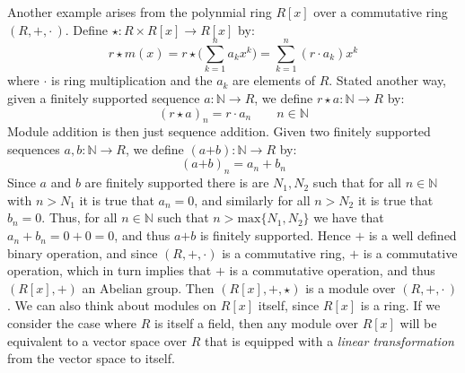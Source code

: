     \begin{example}
        Another example arises from the polynmial ring $R[x]$ over a commutative
        ring $(R,+,\cdot\,)$. Define $\star:R\times{R}[x]\rightarrow{R}[x]$ by:
        \begin{equation}
            r\star{m}(x)
            =r\star\Big(\sum_{k=1}^{n}a_{k}x^{k}\Big)
            =\sum_{k=1}^{n}(r\cdot{a}_{k})x^{k}
        \end{equation}
        where $\cdot$ is ring multiplication and the $a_{k}$ are elements of
        $R$. Stated another way, given a finitely supported sequence
        $a:\mathbb{N}\rightarrow{R}$, we define
        $r\star{a}:\mathbb{N}\rightarrow{R}$ by:
        \begin{equation}
            (r\star{a})_{n}=r\cdot{a}_{n}
            \quad\quad
            n\in\mathbb{N}
        \end{equation}
        Module addition is then just sequence addition. Given two finitely
        supported sequences $a,b:\mathbb{N}\rightarrow{R}$, we define
        $(a\boldsymbol{+}b):\mathbb{N}\rightarrow{R}$ by:
        \begin{equation}
            (a\boldsymbol{+}b)_{n}=a_{n}+b_{n}
        \end{equation}
        Since $a$ and $b$ are finitely supported there is are $N_{1},N_{2}$
        such that for all $n\in\mathbb{N}$ with $n>N_{1}$ it is true that
        $a_{n}=0$, and similarly for all $n>N_{2}$ it is true that $b_{n}=0$.
        Thus, for all $n\in\mathbb{N}$ such that $n>\textrm{max}\{N_{1},N_{2}\}$
        we have that $a_{n}+b_{n}=0+0=0$, and thus $a\boldsymbol{+}b$ is
        finitely supported. Hence $\boldsymbol{+}$ is a well defined binary
        operation, and since $(R,+,\cdot)$ is a commutative ring, $+$ is a
        commutative operation, which in turn implies that $\boldsymbol{+}$ is a
        commutative operation, and thus $(R[x],\boldsymbol{+})$ an Abelian
        group. Then $(R[x],\boldsymbol{+},\star)$ is a module over
        $(R,+,\cdot\,)$. We can also think about modules on $R[x]$ itself, since
        $R[x]$ is a ring. If we consider the case where $R$ is itself a field,
        then any module over $R[x]$ will be equivalent to a vector space over
        $R$ that is equipped with a \textit{linear transformation} from the
        vector space to itself.
    \end{example}
